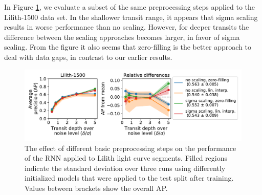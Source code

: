 In Figure \ref{fig:lilith_pp_basic}, we evaluate a subset of the same preprocessing steps applied to the Lilith-1500 data set. In the shallower transit range, it appears that sigma scaling results in worse performance than no scaling. However, for deeper transits the difference between the scaling approaches becomes larger, in favor of sigma scaling. From the figure it also seems that zero-filling is the better approach to deal with data gaps, in contrast to our earlier results.
\begin{figure}
    \centering
    \includegraphics[width=0.8\linewidth]{Experiments/Figures/Preprocessing/lilith1500_AP_pp-basic-gaps.pdf}
    \caption{The effect of different basic preprocessing steps on the performance of the RNN applied to Lilith light curve segments. Filled regions indicate the standard deviation over three runs using differently initialized models that were applied to the test split after training. Values between brackets show the overall AP.}
    \label{fig:lilith_pp_basic}
\end{figure}



